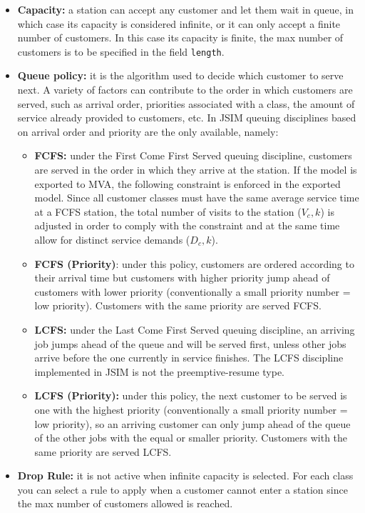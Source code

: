 \begin{itemize}
\item \textbf{Capacity:} a station can accept any customer and let
them wait in queue, in which case its capacity is considered
infinite, or it can only accept a finite number of customers. In
this case its capacity is finite, the max number of customers is
to be specified in the field \texttt{length}.

\item \textbf{Queue policy:} it is the algorithm used to decide
which customer to serve next. A variety of factors can contribute
to the order in which customers are served, such as arrival order,
priorities associated with a class, the amount of service already
provided to customers, etc. In JSIM queuing disciplines based on
arrival order and priority are the only available, namely:
\begin{itemize}
\item \textbf{FCFS:} under the First Come First Served queuing
discipline, customers are served in the order in which they arrive
at the station. If the model is exported to MVA, the following
constraint is enforced in the exported model. Since all customer
classes must have the same average service time at a FCFS station,
the total number of visits to the station ($V_c,k$) is adjusted in
order to comply with the constraint and at the same time allow for
distinct service demands ($D_c,k$). \item \textbf{FCFS
(Priority)}: under this policy, customers are ordered according to
their arrival time but customers with higher priority jump ahead
of customers with lower priority (conventionally a small priority
number = low priority). Customers with the same priority are
served FCFS. \item \textbf{LCFS:} under the Last Come First Served
queuing discipline, an arriving job jumps ahead of the queue and
will be served first, unless other jobs arrive before the one
currently in service finishes. The LCFS discipline implemented in
JSIM is not the preemptive-resume type. \item \textbf{LCFS
(Priority):} under this policy, the next customer to be served is
one with the highest priority (conventionally a small priority
number = low priority), so an arriving customer can only jump
ahead of the queue of the other jobs with the equal or smaller
priority. Customers with the same priority are served LCFS.
\end{itemize}
\item \textbf{Drop Rule:} it is not active when infinite capacity
is selected. For each class you can select a rule to apply when a
customer cannot enter a station since the max number of customers
allowed is reached.
\end{itemize}

